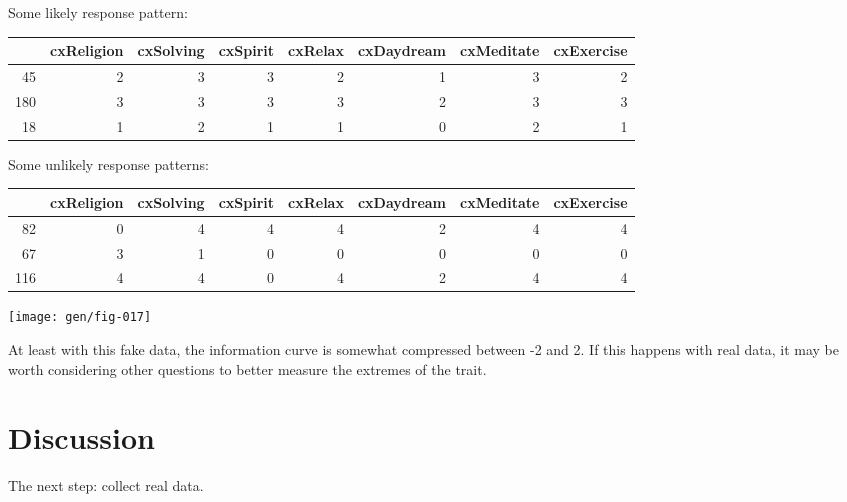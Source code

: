 \documentclass[10pt,utf8x]{beamer}
\begin{document}
\begin{frame}
Some likely response pattern:
\begin{table}[ht]
\begin{center}
{\tiny
\begin{tabular}{rrrrrrrr}
  \hline
 & cxReligion & cxSolving & cxSpirit & cxRelax & cxDaydream & cxMeditate & cxExercise \\ 
  \hline
45 &   2 &   3 &   3 &   2 &   1 &   3 &   2 \\ 
  180 &   3 &   3 &   3 &   3 &   2 &   3 &   3 \\ 
  18 &   1 &   2 &   1 &   1 &   0 &   2 &   1 \\ 
   \hline
\end{tabular}
}
\end{center}
\end{table}
Some unlikely response patterns:
\begin{table}[ht]
\begin{center}
{\tiny
\begin{tabular}{rrrrrrrr}
  \hline
 & cxReligion & cxSolving & cxSpirit & cxRelax & cxDaydream & cxMeditate & cxExercise \\ 
  \hline
82 &   0 &   4 &   4 &   4 &   2 &   4 &   4 \\ 
  67 &   3 &   1 &   0 &   0 &   0 &   0 &   0 \\ 
  116 &   4 &   4 &   0 &   4 &   2 &   4 &   4 \\ 
   \hline
\end{tabular}
}
\end{center}
\end{table}\end{frame}

\begin{frame}
\texttt{[image: gen/fig-017]}

At least with this fake data, the information curve is somewhat
compressed between -2 and 2. If this happens with real data,
it may be worth considering other questions to better measure
the extremes of the trait.
\end{frame}

\section{Discussion}
\begin{frame}

The next step: collect real data.
\end{frame}

 

\end{document}
